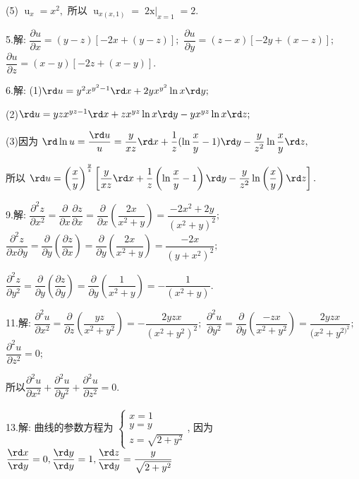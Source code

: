   (5) $ \mathop u\nolimits_x  = {x^2}, $
  所以 $ \mathop u\nolimits_{x(x,1)}  = \mathop {2x|}\nolimits_{x = 1}  = 2$.

  5.解: $ \dfrac{{\partial u}}{{\partial x}} = (y - z)\left[ - 2x + (y - z)\right]; $ \qquad
  $ \dfrac{{\partial u}}{{\partial y}} = (z - x)\left[ - 2y + (x - z)\right]; $ \qquad
  $ \dfrac{{\partial u}}{{\partial z}} = (x - y)\left[ - 2z + (x - y)\right]$.

  6.解: (1)$ \rd u = {y^2}{x^{{y^2} - 1}} \rd x + 2y{x^{{y^2}}}\ln x \rd y; $

  (2)$ \rd u = yz{x^{yz - 1}} \rd x + z{x^{yz}}\ln x \rd y - y{x^{yz}}\ln x \rd z; $

  (3)因为 $ \rd \ln u = \dfrac{{\rd u}}{u} = \dfrac{y}{{xz}} \rd x + \dfrac{1}{z}(\ln \dfrac{x}{y} - 1) \rd y - \dfrac{y}{{{z^2}}}\ln \dfrac{x}{y}\rd z, $

  所以 $ \rd u = {\left( \dfrac{x}{y} \right)^{\frac{y}{z}}} \left[\dfrac{y}{{xz}} \rd x + \dfrac{1}{z} \left(\ln \dfrac{x}{y} - 1 \right) \rd y - \dfrac{y}{{{z^2}}}\ln \left(\dfrac{x}{y} \right) \rd z \right]. $

  9.解: $ \dfrac{{{\partial ^2}z}}{{\partial {x^2}}} = \dfrac{\partial }{{\partial x}}\dfrac{{\partial z}}{{\partial x}} = \dfrac{\partial }{{\partial x}}(\dfrac{{2x}}{{{x^2} + y}}) = \dfrac{{ - 2{x^2} + 2y}}{{{{({x^2} + y)}^2}}}; $\quad
  $ \dfrac{{{\partial ^2}z}}{{\partial x\partial y}} = \dfrac{\partial }{{\partial y}}(\dfrac{{\partial z}}{{\partial x}}) = \dfrac{\partial }{{\partial y}}(\dfrac{{2x}}{{{x^2} + y}}) = \dfrac{{ - 2x}}{{{{(y + {x^2})}^2}}}; $

  $ \dfrac{{{\partial ^2}z}}{{\partial {y^2}}} = \dfrac{\partial }{{\partial y}}(\dfrac{{\partial z}}{{\partial y}}) = \dfrac{\partial }{{\partial y}}(\dfrac{1}{{{x^2} + y}}) =  - \dfrac{1}{{({x^2} + y)}}. $

  11.解: $ \dfrac{{{\partial ^2}u}}{{\partial {x^2}}} = \dfrac{\partial }{{\partial z}}(\dfrac{{yz}}{{{x^2} + {y^2}}}) =  - \dfrac{{2yzx}}{{{{({x^2} + {y^2})}^2}}}; $\qquad
  $ \dfrac{{{\partial ^2}u}}{{\partial {y^2}}} = \dfrac{\partial }{{\partial y}}(\dfrac{{ - zx}}{{{x^2} + {y^2}}}) = \dfrac{{2yzx}}{{({x^2} + {y^{2{)^2}}}}}; $\qquad
  $ \dfrac{{{\partial ^2}u}}{{\partial {z^2}}} = 0; $

  所以$ \dfrac{{{\partial ^2}u}}{{\partial {x^2}}} + \dfrac{{{\partial ^2}u}}{{\partial {y^2}}} + \dfrac{{{\partial ^2}u}}{{\partial {z^2}}} = 0. $

  13.解: 曲线的参数方程为
  $\begin{cases}
  x = 1 \\
  y = y \\
  z = \sqrt{2 + y^2}
  \end{cases}$,
  因为 $ \dfrac{{\rd x}}{{\rd y}} = 0,\dfrac{{\rd y}}{{\rd y}} = 1,\dfrac{{\rd z}}{{\rd y}} = \dfrac{y}{{\sqrt {2 + {y^2}} }} $

